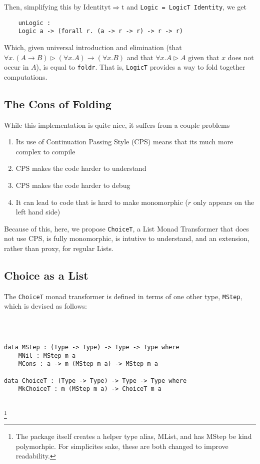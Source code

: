Then, simplifying this by $\mathrm{Identity t} \Rightarrow \mathrm{t}$ and \verb|Logic = LogicT Identity|, we get 
\begin{verbatim}
	unLogic :
	Logic a -> (forall r. (a -> r -> r) -> r -> r) 
\end{verbatim}

Which, given universal introduction and elimination (that $\forall x . (A \to B) \rhd (\forall x . A) \to (\forall x . B)$ and that $\forall x . A \rhd A$ given that $x$ does not occur in $A$), is equal to \verb|foldr|.
That is, \verb|LogicT| provides a way to fold together computations.

\subsection{The Cons of Folding}

While this implementation is quite nice, it suffers from a couple problems
\begin{enumerate}
	\item Its use of Continuation Passing Style (CPS) means that its much more complex to compile\needcite 
	\item CPS makes the code harder to understand\needcite 
	\item CPS makes the code harder to debug
	\item It can lead to code that is hard to make monomorphic ($r$ only appears on the left hand side)
	
\end{enumerate}

Because of this, here, we propose \verb|ChoiceT|, a List Monad Transformer that does not use CPS, is fully monomorphic, is intutive to understand, and an extension, rather than proxy, for regular Lists.

\subsection{Choice as a List}

The \verb|ChoiceT| monad transformer is defined in terms of one other type, \verb|MStep|, which is devised as follows:

\begin{verbatim}
	


data MStep : (Type -> Type) -> Type -> Type where 
	MNil : MStep m a
	MCons : a -> m (MStep m a) -> MStep m a

data ChoiceT : (Type -> Type) -> Type -> Type where 
	MkChoiceT : m (MStep m a) -> ChoiceT m a
	
\end{verbatim}
\footnote{The package itself creates a helper type alias, \textrm{MList}, and has \textrm{MStep} be kind polymorhpic.
	For simplicites sake, these are both changed to improve readability.}
	
